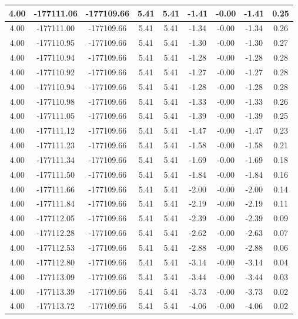 \begin{table}[htbp]
\begin{adjustbox}{angle=90}
\begin{tabular}{|c|c|c|c|c|c|c|c|c|}
 4.00 & -177111.06 & -177109.66 & 5.41 & 5.41 & -1.41 & -0.00 & -1.41 & 0.25\\ \hline
 4.00 & -177111.00 & -177109.66 & 5.41 & 5.41 & -1.34 & -0.00 & -1.34 & 0.26\\ \hline
 4.00 & -177110.95 & -177109.66 & 5.41 & 5.41 & -1.30 & -0.00 & -1.30 & 0.27\\ \hline
 4.00 & -177110.94 & -177109.66 & 5.41 & 5.41 & -1.28 & -0.00 & -1.28 & 0.28\\ \hline
 4.00 & -177110.92 & -177109.66 & 5.41 & 5.41 & -1.27 & -0.00 & -1.27 & 0.28\\ \hline
 4.00 & -177110.94 & -177109.66 & 5.41 & 5.41 & -1.28 & -0.00 & -1.28 & 0.28\\ \hline
 4.00 & -177110.98 & -177109.66 & 5.41 & 5.41 & -1.33 & -0.00 & -1.33 & 0.26\\ \hline
 4.00 & -177111.05 & -177109.66 & 5.41 & 5.41 & -1.39 & -0.00 & -1.39 & 0.25\\ \hline
 4.00 & -177111.12 & -177109.66 & 5.41 & 5.41 & -1.47 & -0.00 & -1.47 & 0.23\\ \hline
 4.00 & -177111.23 & -177109.66 & 5.41 & 5.41 & -1.58 & -0.00 & -1.58 & 0.21\\ \hline
 4.00 & -177111.34 & -177109.66 & 5.41 & 5.41 & -1.69 & -0.00 & -1.69 & 0.18\\ \hline
 4.00 & -177111.50 & -177109.66 & 5.41 & 5.41 & -1.84 & -0.00 & -1.84 & 0.16\\ \hline
 4.00 & -177111.66 & -177109.66 & 5.41 & 5.41 & -2.00 & -0.00 & -2.00 & 0.14\\ \hline
 4.00 & -177111.84 & -177109.66 & 5.41 & 5.41 & -2.19 & -0.00 & -2.19 & 0.11\\ \hline
 4.00 & -177112.05 & -177109.66 & 5.41 & 5.41 & -2.39 & -0.00 & -2.39 & 0.09\\ \hline
 4.00 & -177112.28 & -177109.66 & 5.41 & 5.41 & -2.62 & -0.00 & -2.63 & 0.07\\ \hline
 4.00 & -177112.53 & -177109.66 & 5.41 & 5.41 & -2.88 & -0.00 & -2.88 & 0.06\\ \hline
 4.00 & -177112.80 & -177109.66 & 5.41 & 5.41 & -3.14 & -0.00 & -3.14 & 0.04\\ \hline
 4.00 & -177113.09 & -177109.66 & 5.41 & 5.41 & -3.44 & -0.00 & -3.44 & 0.03\\ \hline
 4.00 & -177113.39 & -177109.66 & 5.41 & 5.41 & -3.73 & -0.00 & -3.73 & 0.02\\ \hline
 4.00 & -177113.72 & -177109.66 & 5.41 & 5.41 & -4.06 & -0.00 & -4.06 & 0.02\\ \hline

\end{tabular}
\end{adjustbox}
\end{table}
